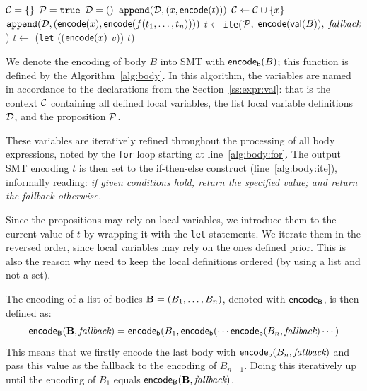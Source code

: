 \begin{algorithm}[H]
  \caption{$\encodeb(B,\mathit{fallback})$}\label{alg:body}
  \BlankLine
  $\mathcal{C} = \{\}$\;
  $\mathcal{P} = \texttt{true}$\;
  $\mathcal{D} = ()$\;
   {
     {
      $\texttt{append}(\mathcal{D},(x,\mathsf{encode}(t)))$\;
      $\mathcal{C} \leftarrow \mathcal{C} \cup \{x\}$
    }  {
      $\texttt{append}(\mathcal{D},(\mathsf{encode}(x),\mathsf{encode}(f(t_1,\ldots,t_n))))$
    } 
  }
  $t \leftarrow $\texttt{ite}($\mathcal{P},\; \mathsf{encode}(\mathsf{val}(B)),\; \mathit{fallback}$)\label{alg:body:ite}\;
   {
    $t \leftarrow $ (\texttt{let} (($\mathsf{encode}(x)$ $v$)) $t$)
  }
\end{algorithm}

We denote the encoding of body $B$ into SMT with $\mathsf{encode_{\tiny{b}}}(B)$; this function is defined by the Algorithm~\ref{alg:body}.
In this algorithm, the variables are named in accordance to the declarations from the Section~\ref{ss:expr:val}: that is the context $\mathcal{C}$ containing all defined local variables, the list local variable definitions $\mathcal{D}$, and the proposition $\mathcal{P}$.

These variables are iteratively refined throughout the processing of all body expressions, noted by the \texttt{for} loop starting at line~\ref{alg:body:for}.
The output SMT encoding $t$ is then set to the if-then-else construct (line~\ref{alg:body:ite}), informally reading: \textit{if given conditions hold, return the specified value; and return the fallback otherwise.}

Since the propositions may rely on local variables, we introduce them to the current value of $t$ by wrapping it with the \texttt{let} statements.
We iterate them in the reversed order, since local variables may rely on the ones defined prior.
This is also the reason why need to keep the local definitions ordered (by using a list and not a set).

The encoding of a list of bodies $\mathbf{B} = (B_1,\ldots,B_n)$, denoted with $\mathsf{encode_{\tiny{B}}}$, is then defined as:
$$\mathsf{encode_{\tiny{B}}}(\mathbf{B},\textit{fallback}) = \mathsf{encode_{\tiny{b}}}(B_1,\mathsf{encode_{\tiny{b}}}(\cdots\mathsf{encode_{\tiny{b}}}(B_n,\textit{fallback})\cdots)$$
This means that we firstly encode the last body with $\mathsf{encode_{\tiny{b}}}(B_n,\textit{fallback})$ and pass this value as the fallback to the encoding of $B_{n-1}$.
Doing this iteratively up until the encoding of $B_1$ equals $\mathsf{encode_{\tiny{B}}}(\mathbf{B},\textit{fallback})$.

